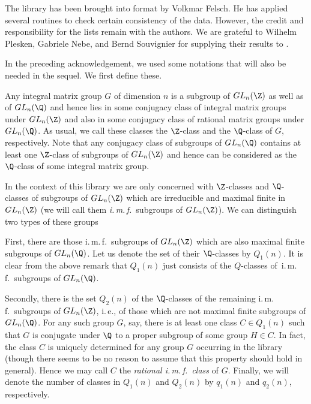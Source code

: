 The library has been brought into {\GAP} format by Volkmar Felsch. He has
applied several {\GAP} routines to check certain consistency of the data.
However, the  credit  and responsibility for  the lists   remain with the
authors. We are   grateful to Wilhelm Plesken,  Gabriele  Nebe, and Bernd
Souvignier for supplying their results to {\GAP}.

In the preceding  acknowledgement, we used  some notations that will also
be needed in the sequel. We first define these.

Any  integral matrix   group  $G$  of  dimension   $n$ is a  subgroup  of
$GL_n(\Z)$ as  well  as of  $GL_n(\Q)$  and hence lies in  some conjugacy
class of integral  matrix groups   under  $GL_n(\Z)$  and also in    some
conjugacy class of rational matrix  groups under $GL_n(\Q)$. As usual, we
call  these  classes    the  $\Z$-class   and the   $\Q$-class   of  $G$,
respectively.  Note that any conjugacy  class of subgroups of  $GL_n(\Q)$
contains at least one $\Z$-class of subgroups of $GL_n(\Z)$ and hence can
be considered as the $\Q$-class of some integral matrix group.

In the context  of this library  we are only concerned  with $\Z$-classes
and $\Q$-classes of subgroups   of $GL_n(\Z)$ which are irreducible   and
maximal    finite   in     $GL_n(\Z)$   (we   will    call   them    {\em
i.\,m.\,f.}~subgroups  of $GL_n(\Z)$).  We can  distinguish  two types of
these groups\:

First, there are those i.\,m.\,f.~subgroups  of $GL_n(\Z)$ which are also
maximal finite subgroups of $GL_n(\Q)$.  Let  us  denote the set of their
$\Q$-classes by $Q_1(n)$. It is clear from the above remark that $Q_1(n)$
just consists of the $Q$-classes of\, i.\,m.\,f.~subgroups of $GL_n(\Q)$.

Secondly, there is the set $Q_2(n)$ of the  $\Q$-classes of the remaining
i.\,m.\,f.~subgroups  of  $GL_n(\Z)$, i.\,e.,  of   those which  are  not
maximal finite  subgroups  of $GL_n(\Q)$. For any   such group $G$,  say,
there is at least  one class $C \in  Q_1(n)$ such  that $G$ is  conjugate
under  $\Q$ to a proper subgroup  of some group  $H \in C$.  In fact, the
class  $C$ is uniquely  determined  for any  group $G$  occurring in  the
library (though there seems to be no reason  to assume that this property
should hold  in  general). Hence  we may   call   $C$ the {\em   rational
i.\,m.\,f.~class}  of $G$. Finally, we  will denote the number of classes
in $Q_1(n)$ and $Q_2(n)$ by $q_1(n)$ and $q_2(n)$, respectively.

